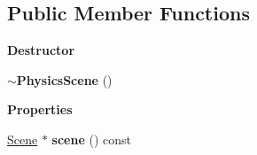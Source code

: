 \subsection*{Public Member Functions}
\begin{Indent}\textbf{ Destructor}\par
\begin{DoxyCompactItemize}
\item 
\mbox{\label{classrev_1_1_physics_scene_ae4d2a39a0131c56136c250b899b9e802}} 
{\bfseries $\sim$\+Physics\+Scene} ()
\end{DoxyCompactItemize}
\end{Indent}
\begin{Indent}\textbf{ Properties}\par
\begin{DoxyCompactItemize}
\item 
\mbox{\label{classrev_1_1_physics_scene_a10c8c055b5ef00c47a3a07ad27844188}} 
\mbox{\hyperlink{classrev_1_1_scene}{Scene}} $\ast$ {\bfseries scene} () const
\end{DoxyCompactItemize}
\end{Indent}
